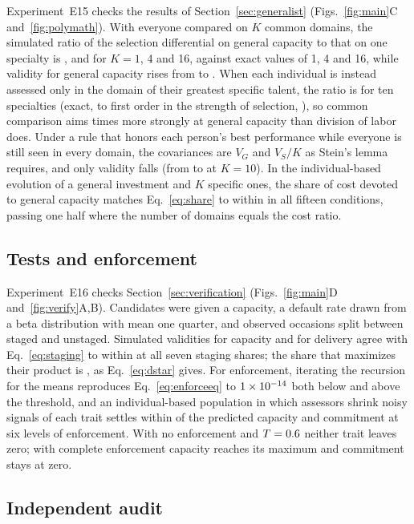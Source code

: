 Experiment~E15 checks the results of Section~\ref{sec:generalist} (Figs.~\ref{fig:main}C and~\ref{fig:polymath}). With everyone compared on $K$
common domains, the simulated ratio of the selection differential on general capacity to that on one specialty is
\PolyRatioOne, \PolyRatioFour{} and \PolyRatioSixteen{} for $K=1$, 4 and 16, against exact values of 1, 4 and 16, while validity
for general capacity rises from \PolyValOne{} to \PolyValSixteen. When each individual is instead assessed only in the domain
of their greatest specific talent, the ratio is \PolyDivSimTen{} for ten specialties (exact, to first order in the strength of
selection, \PolyDivExTen), so common comparison aims \PolyDivTen{} times more strongly at general capacity than division of
labor does. Under a rule that honors each person's best performance while everyone is still seen in every domain, the
covariances are $V_G$ and $V_S/K$ as Stein's lemma requires, and only validity falls (from \PolySteinMean{} to \PolySteinMax{} at
$K=10$). In the individual-based evolution of a general investment and $K$ specific ones, the share of cost devoted to
general capacity matches Eq.~\eqref{eq:share} to within \PolyShareErr{} in all fifteen conditions, passing one half where the
number of domains equals the cost ratio.

\subsection{Tests and enforcement}

Experiment~E16 checks Section~\ref{sec:verification} (Figs.~\ref{fig:main}D and~\ref{fig:verify}A,B). Candidates were given a capacity, a default
rate drawn from a beta distribution with mean one quarter, and \VerN{} observed occasions split between staged and unstaged.
Simulated validities for capacity and for delivery agree with Eq.~\eqref{eq:staging} to within \VerMaxDiff{} at all seven
staging shares; the share that maximizes their product is \VerDstar, as Eq.~\eqref{eq:dstar} gives. For enforcement,
iterating the recursion for the means reproduces Eq.~\eqref{eq:enforceeq} to $1\times10^{-14}$ both below and above the
threshold, and an individual-based population in which assessors shrink noisy signals of each trait settles within
\EnfIbmDiff{} of the predicted capacity and commitment at six levels of enforcement. With no enforcement and $T=0.6$
neither trait leaves zero; with complete enforcement capacity reaches its maximum and commitment stays at zero.

\subsection{Independent audit}\label{sec:auditnum}

